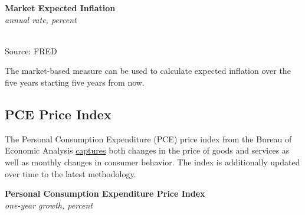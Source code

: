 \documentclass{report}
\makeatletter
\newcommand{\tbllink}[1]{\href{https://raw.githubusercontent.com/bdecon/US-chartbook/master/chartbook/data/#1}{\faTable}}
\newcommand*\short[1]{\expandafter\@gobbletwo\number\numexpr#1\relax}
\newcommand{\absnode}[3]{\node[below right, align=left] at (axis cs: #1,#2) {#3};}
\newcommand{\ltdateaxisticks}{
		date coordinates in=x, axis line style={draw=none},
		xmax={2022-10-31},
		max space between ticks=40,	    
		xtick={{2013-01-01}, {2014-01-01}, {2015-01-01}, {2016-01-01}, {2017-01-01}, {2018-01-01}, 
		    {2019-01-01}, {2020-01-01}, {2021-01-01}, {2022-01-01}},
		enlarge y limits={0.06}, enlarge x limits={0.01},
		}
\newcommand{\bbar}[2]{extra #1 ticks = {{#2}}, extra #1 tick labels = ,
		extra #1 tick style = {grid=major, grid style={thick, black!25}},}
\newcommand{\thinline}[4]{\addplot[no markers, color=#1] 
		table [x=#2, y=#3, col sep=comma] {#4};	}
\newcommand{\rbar}{
		\fill[color=black!10] (axis cs:{2020-02-01},\pgfkeysvalueof{/pgfplots/ymin}) rectangle 
			(axis cs:{2020-05-01}, \pgfkeysvalueof{/pgfplots/ymax});}
\makeatother
\begin{document}
{\begin{minipage}{0.47\textwidth}
\normalsize \textbf{Market Expected Inflation}\\
\footnotesize{\textit{annual rate, percent}}\\
\hspace*{-2mm} \\
\footnotesize{Source: FRED} \hfill \tbllink{infbreak_comb.csv}
\end{minipage} \hspace{6mm} 
\begin{minipage}{0.24\textwidth}
\small The market-based measure can be used to calculate expected inflation over the five years starting five years from now. 
\end{minipage}
\newpage
\hypertarget{prpce}{}
\begin{minipage}{0.76\textwidth}
\subsection*{PCE Price Index}
\small The Personal Consumption Expenditure (PCE) price index from the Bureau of Economic Analysis \href{https://www.bea.gov/data/personal-consumption-expenditures-price-index}{captures} both changes in the price of goods and services as well as monthly changes in consumer behavior. The index is additionally updated over time to the latest methodology. 


\vspace{1mm}

\normalsize \textbf{Personal Consumption Expenditure Price Index}\\
\footnotesize{\textit{one-year growth, percent}}\\
\vspace{35mm}


\end{minipage}}
\end{document}

